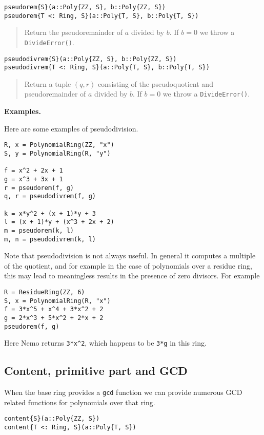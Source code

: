 \documentclass[a4paper,10pt]{article}
\newcommand{\code}{\lstinline}
\newcommand{\desc}[1]{\vspace{-3mm}\begin{quote}#1\end{quote}}
\begin{document}
{{{{{{\begin{lstlisting}
pseudorem{S}(a::Poly{ZZ, S}, b::Poly{ZZ, S})
pseudorem{T <: Ring, S}(a::Poly{T, S}, b::Poly{T, S})
\end{lstlisting}

\desc{Return the pseudoremainder of $a$ divided by $b$. If $b = 0$ we throw a 
\code{DivideError()}.}

\begin{lstlisting}
pseudodivrem{S}(a::Poly{ZZ, S}, b::Poly{ZZ, S})
pseudodivrem{T <: Ring, S}(a::Poly{T, S}, b::Poly{T, S})
\end{lstlisting}

\desc{Return a tuple $(q, r)$ consisting of the pseudoquotient and pseudoremainder 
of $a$ divided by $b$. If $b = 0$ we throw a \code{DivideError()}.}

\textbf{Examples.}

Here are some examples of pseudodivision.

\begin{lstlisting}
R, x = PolynomialRing(ZZ, "x")
S, y = PolynomialRing(R, "y")

f = x^2 + 2x + 1
g = x^3 + 3x + 1
r = pseudorem(f, g)
q, r = pseudodivrem(f, g)

k = x*y^2 + (x + 1)*y + 3
l = (x + 1)*y + (x^3 + 2x + 2)
m = pseudorem(k, l)
m, n = pseudodivrem(k, l)
\end{lstlisting}

Note that pseudodivision is not always useful. In general it computes a
multiple of the quotient, and for example in the case of polynomials over a
residue ring, this may lead to meaningless results in the presence of zero
divisors. For example

\begin{lstlisting}
R = ResidueRing(ZZ, 6)
S, x = PolynomialRing(R, "x")
f = 3*x^5 + x^4 + 3*x^2 + 2
g = 2*x^3 + 5*x^2 + 2*x + 2
pseudorem(f, g)
\end{lstlisting}

Here Nemo returns \code{3*x^2}, which happens to be \code{3*g} in this
ring.

\subsection{Content, primitive part and GCD}

When the base ring provides a \code{gcd} function we can provide numerous
GCD related functions for polynomials over that ring.

\begin{lstlisting}
content{S}(a::Poly{ZZ, S})
content{T <: Ring, S}(a::Poly{T, S})
\end{lstlisting}

}}}}}}
\end{document}
